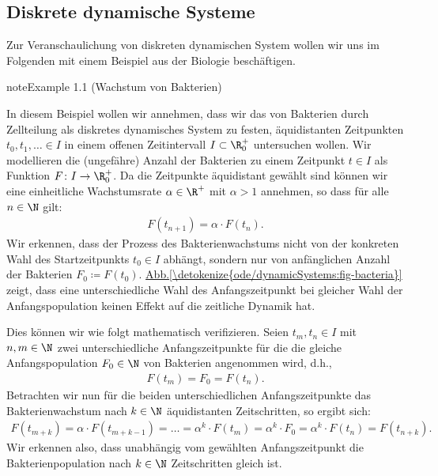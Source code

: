 \documentclass[letterpaper,10pt,german]{jupyterBook}
\begin{document}
\subsection{Diskrete dynamische Systeme}
\label{\detokenize{ode/dynamicSystems:diskrete-dynamische-systeme}}
\sphinxAtStartPar
Zur Veranschaulichung von diskreten dynamischen System wollen wir uns im Folgenden mit einem Beispiel aus der Biologie beschäftigen.
\label{ode/dynamicSystems:ex:bacteria}
\begin{sphinxadmonition}{note}{Example 1.1 (Wachstum von Bakterien)}



\sphinxAtStartPar
In diesem Beispiel wollen wir annehmen, dass wir das  von Bakterien durch Zellteilung als diskretes dynamisches System zu festen, äquidistanten Zeitpunkten \(t_0, t_1, \ldots \in I\) in einem offenen Zeitintervall \(I\subset\R^+_0\) untersuchen wollen.
Wir modellieren die (ungefähre) Anzahl der Bakterien zu einem Zeitpunkt \(t \in I\) als Funktion \(F \colon I \rightarrow \R_0^+\).
Da die Zeitpunkte äquidistant gewählt sind können wir eine einheitliche Wachstumsrate \(\alpha \in \R^+\) mit \(\alpha > 1\) annehmen, so dass für alle \(n \in \N\) gilt:
\begin{equation*}
\begin{split}F(t_{n+1}) = \alpha \cdot F(t_n).\end{split}
\end{equation*}
\sphinxAtStartPar
Wir erkennen, dass der Prozess des Bakterienwachstums nicht von der konkreten Wahl des Startzeitpunkts \(t_0 \in I\) abhängt, sondern nur von anfänglichen Anzahl der Bakterien \(F_0 \coloneqq F(t_0)\). \hyperref[\detokenize{ode/dynamicSystems:fig-bacteria}]{Abb.\@ \ref{\detokenize{ode/dynamicSystems:fig-bacteria}}} zeigt, dass eine unterschiedliche Wahl des Anfangszeitpunkt bei gleicher Wahl der Anfangspopulation keinen Effekt auf die zeitliche Dynamik hat.

\sphinxAtStartPar
Dies können wir wie folgt mathematisch verifizieren. Seien \(t_m, t_n \in I\) mit \(n,m \in \N\) zwei unterschiedliche Anfangszeitpunkte für die die gleiche Anfangspopulation \(F_0 \in \N\) von Bakterien angenommen wird, d.h.,
\begin{equation*}
\begin{split}F(t_m) = F_0 = F(t_n).\end{split}
\end{equation*}
\sphinxAtStartPar
Betrachten wir nun für die beiden unterschiedlichen Anfangszeitpunkte das Bakterienwachstum nach \(k \in \N\) äquidistanten Zeitschritten, so ergibt sich:
\begin{equation*}
\begin{split}F(t_{m+k}) = \alpha \cdot F(t_{m+k-1}) = \ldots = \alpha^k \cdot F(t_{m}) = \alpha^k \cdot F_0 = \alpha^k \cdot F(t_n) = F(t_{n+k}).\end{split}
\end{equation*}
\sphinxAtStartPar
Wir erkennen also, dass unabhängig vom gewählten Anfangszeitpunkt die Bakterienpopulation nach \(k \in \N\) Zeitschritten gleich ist.
\end{sphinxadmonition}
\end{document}

